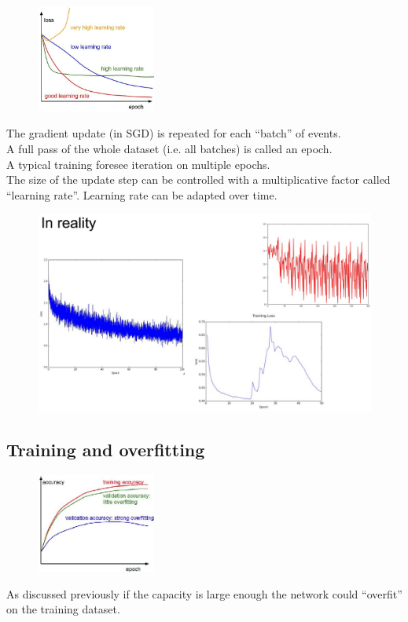 \begin{figure}
	\includegraphics[width=0.35\textwidth]{figure_ml/learning_rate.png}
\end{figure} 

The gradient update (in SGD) is repeated for each “batch” of events.\\

A full pass of the whole dataset (i.e. all batches) is called an epoch.\\

A typical training foresee iteration on multiple epochs.\\

The size of the update step can be controlled with a multiplicative factor called “learning rate”. Learning rate can be adapted over time.

\begin{figure}[ht]
	\centering
	\includegraphics[width=0.8\linewidth]{figure_ml/real_lr.png}
\end{figure}
\FloatBarrier

\clearpage
\subsection{Training and overfitting}

\begin{figure}
	\includegraphics[width=0.35\textwidth]{figure_ml/training_overfitting.png}
\end{figure} 
As discussed previously if the capacity is large enough the network could “overfit” on the training dataset.

